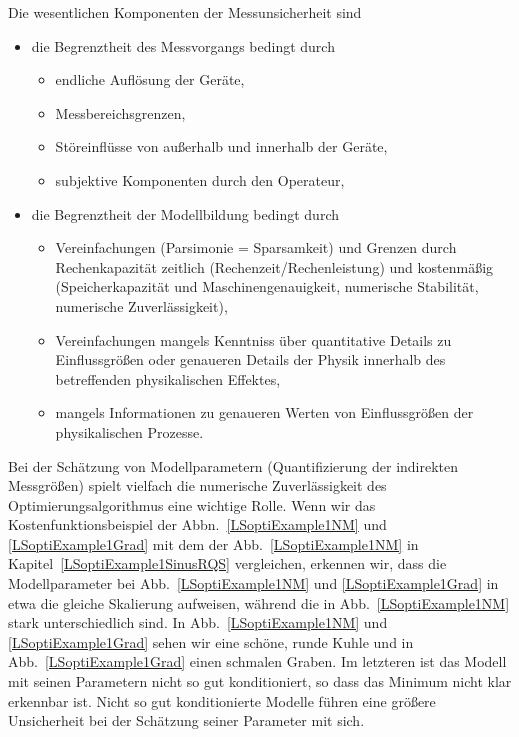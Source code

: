 Die wesentlichen Komponenten der Messunsicherheit sind
\begin{itemize}
\item die Begrenztheit des Messvorgangs bedingt durch
  \begin{itemize}
  \item endliche Auflösung der Geräte,
  \item Messbereichsgrenzen,
  \item Störeinflüsse von außerhalb und innerhalb der Geräte,
  \item subjektive Komponenten durch den Operateur,
  \end{itemize}
\item die Begrenztheit der Modellbildung bedingt durch
  \begin{itemize}
  \item Vereinfachungen (Parsimonie = \glqq Sparsamkeit\grqq)
    und Grenzen durch Rechenkapazität zeitlich (Rechenzeit/Rechenleistung)
    und kostenmäßig (Speicherkapazität und Maschinengenauigkeit,
    numerische Stabilität, numerische Zuverlässigkeit),
  \item Vereinfachungen mangels Kenntniss über quantitative Details
    zu Einflussgrößen
    oder genaueren Details der Physik innerhalb des
    betreffenden physikalischen Effektes,
  \item mangels Informationen zu genaueren Werten von Einflussgrößen der
    physikalischen Prozesse.
  \end{itemize}
\end{itemize}

Bei der Schätzung von Modellparametern (Quantifizierung der indirekten Messgrößen)
spielt vielfach die numerische Zuverlässigkeit des Optimierungsalgorithmus eine
wichtige Rolle. Wenn wir das Kosten\-funktions\-beispiel der Abbn.~\ref{LSoptiExample1NM} und \ref{LSoptiExample1Grad}
mit dem der Abb.~\ref{LSoptiExample1NM} in Kapitel~\ref{LSoptiExample1SinusRQS} vergleichen,
erkennen wir, dass die Modellparameter bei Abb.~\ref{LSoptiExample1NM} und \ref{LSoptiExample1Grad}
in etwa die gleiche Skalierung aufweisen, während die in Abb.~\ref{LSoptiExample1NM} stark unterschiedlich sind. In Abb.~\ref{LSoptiExample1NM} und \ref{LSoptiExample1Grad} sehen wir eine schöne, runde
Kuhle und in Abb.~\ref{LSoptiExample1Grad} einen schmalen Graben. Im letzteren ist das Modell mit seinen
Parametern nicht so gut konditioniert, so dass das Minimum nicht klar erkennbar ist.
Nicht so gut konditionierte Modelle führen eine größere Unsicherheit bei der Schätzung
seiner Parameter mit sich.

